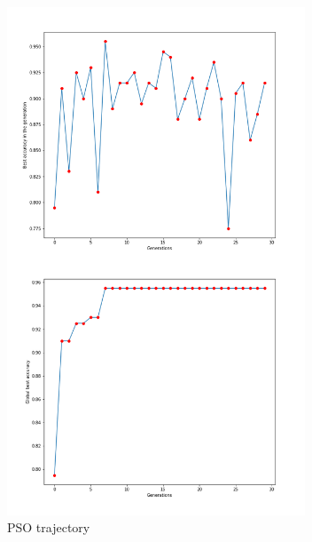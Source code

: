 \documentclass[conference]{IEEEtran}
\begin{document}
\begin{figure}[!t]
	\centering
	\includegraphics[width=3.5in]{trajectory}
	\caption{PSO trajectory}
	\label{fig:VisualTrajectory}
\end{figure}
\end{document}
